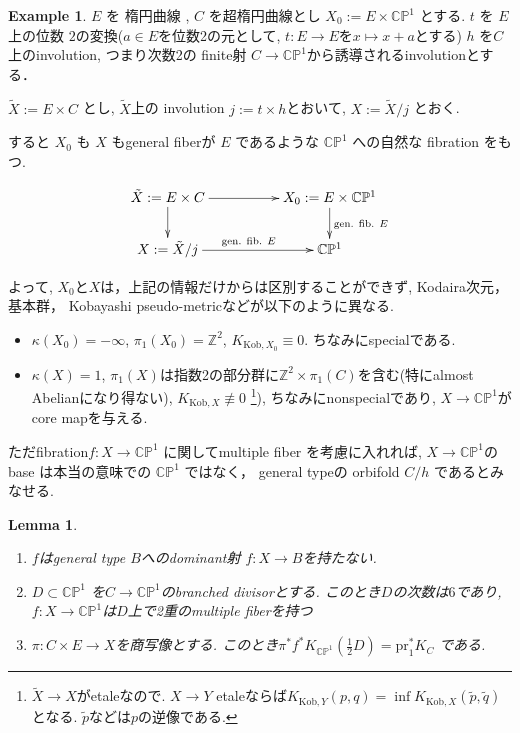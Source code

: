 \documentclass[dvipdfmx,a4paper,11pt]{article} %
\newtheorem{lem}[thm]{Lemma}
\theoremstyle{definition}
\newtheorem{ex}[thm]{Example}
\theoremstyle{remark}
\numberwithin{equation}{section}
\newcommand{\Z}{\mathbb{Z}}
\newcommand{\C}{\mathbb{C}}
\begin{document}
\begin{ex}
\cite[Example 1.1]{Cam04}
\label{ex-Cam04-1.1}
$E$ を 楕円曲線 , \(C\) を超楕円曲線とし
$X_0 := E \times \C\mathbb{P}^1$ とする.
 \(t\) を \(E\) 上の位数 \(2\)の変換($a \in E$を位数2の元として, $t : E \to E$を$x \mapsto x + a$とする)
 \(h\) を\(C\) 上のinvolution, つまり次数2の finite射 $C\to \C\mathbb{P}^1$から誘導されるinvolutionとする． 
 
  \(\tilde{X} := E \times C\) とし, $\tilde{X}$上の
involution $j := t \times h$とおいて, \(X := \tilde{X}/j\) とおく. 

すると \(X_0\) も \(X\) もgeneral fiberが $E$ であるような $\C\mathbb{P}^1$ への自然な fibration をもつ.

  \[
\xymatrix@C=50pt@R=20pt{
\tilde{X} := E \times C \ar@{->}[r]\ar@{->}[d] & X_0 := E \times \C\mathbb{P}^1 \ar@{->}[d]^{\text{gen. fib. $E$}}\\
X := \tilde{X}/j \ar@{->}[r]^{\text{gen. fib. $E$}}& \C\mathbb{P}^1 \\
}
\]

よって, $X_0$と$X$は，上記の情報だけからは区別することができず, Kodaira次元， 基本群， Kobayashi pseudo-metricなどが以下のように異なる. 
\begin{itemize}
\item $\kappa(X_0) = - \infty$, $\pi_{1}(X_0) = \Z^2$, $K_{\mathrm{Kob}, X_0} \equiv 0$. ちなみにspecialである. 
\item $\kappa(X) =1$, $\pi_{1}(X)$は指数2の部分群に$\Z^2 \times \pi_1(C)$を含む(特にalmost Abelianになり得ない), $K_{\mathrm{Kob}, X} \not \equiv 0$
\footnote{$\tilde{X} \to X$がetaleなので. $X \to Y$ etaleならば$K_{\mathrm{Kob}, Y}(p,q)=\inf K_{\mathrm{Kob}, X}(\tilde{p}, \tilde{q})$となる. $\tilde{p}$などは$p$の逆像である.}), ちなみにnonspecialであり, $X \to \C\mathbb{P}^1 $がcore mapを与える. 
\end{itemize}

ただfibration\(f : X \to \C\mathbb{P}^1\) に関してmultiple fiber を考慮に入れれば, $X \to \C\mathbb{P}^1 $の base は本当の意味での \(\C\mathbb{P}^1\) ではなく， general typeの orbifold \(C/h\) であるとみなせる. 
\end{ex}
\begin{lem}
\label{lem-Cam04-1.1}
\begin{enumerate}
\item $f$はgeneral type $B$へのdominant射 \( f: X \to B \)を持たない.
\item \( D \subset \C\mathbb{P}^1 \) を$C \to \C\mathbb{P}^1$のbranched divisorとする. 
このとき$D$の次数は\( 6 \)であり,  \( f : X\to \C\mathbb{P}^1\)は$D$上で2重のmultiple fiberを持つ
\item $\pi : C \times E \to X$を商写像とする.
 このとき\( \pi^{*}f^* K_{\C\mathbb{P}^1}(\frac{1}{2} D)=\mathrm{pr}_1^* K_C \) である. 
\end{enumerate}
\end{lem}
\end{document}
